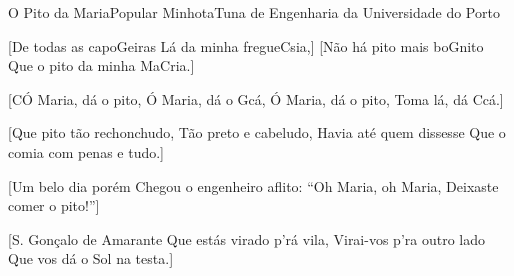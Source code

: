 \begin{musica}{O Pito da Maria}{Popular Minhota}{Tuna de Engenharia da Universidade do Porto}

[De todas as capo\ac{G}{ei}ras
Lá da minha fregue\ac{C}{sia},] 
[Não há pito mais bo\ac{G}{ni}to
Que o pito da minha Ma\ac{C}{ria}.] 

[\ac{C}{Ó} Maria, dá o pito,
Ó Maria, dá o \ac{G}{cá},
Ó Maria, dá o pito,
Toma lá, dá \ac{C}{cá}.] 

[Que pito tão rechonchudo,
Tão preto e cabeludo,
Havia até quem dissesse
Que o comia com penas e tudo.] 

[Um belo dia porém
Chegou o engenheiro aflito:
“Oh Maria, oh Maria,
Deixaste comer o pito!”] 

[S. Gonçalo de Amarante
Que estás virado p’rá vila,
Virai-vos p’ra outro lado
Que vos dá o Sol na testa.] 

\end{musica}
